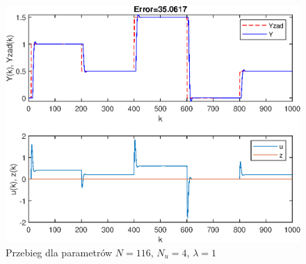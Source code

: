 \begin{figure}
	\centering
	\includegraphics[scale=1]{Rys/przebieg1.eps}
	\caption{Przebieg dla parametrów $N = 116$, $N_u = 4$, $\lambda = 1$}
	\label{fig:przebieg1}
\end{figure}
